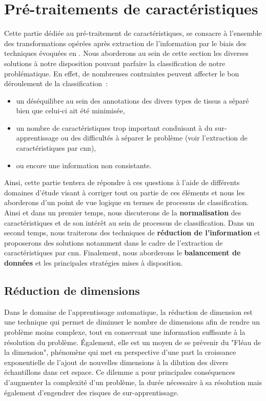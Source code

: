 \clearpage


\section{Pré-traitements de caractéristiques}
Cette partie dédiée au pré-traitement de caractéristiques, se consacre à l'ensemble des transformations opérées après extraction de l'information par le biais des techniques évoquées en . Nous aborderons au sein de cette section les diverses solutions à notre disposition pouvant parfaire la classification de notre problématique. En effet, de nombreuses contraintes peuvent affecter le bon déroulement de la classification~:
\begin{itemize}
    \item un déséquilibre au sein des annotations des divers types de tissus a séparé bien que celui-ci ait été minimisée,
    \item un nombre de caractéristiques trop important conduisant à du sur-apprentissage ou des difficultés à séparer le problème (voir l'extraction de caractéristiques par \gls{cnn}),
    \item ou encore une information non consistante.
\end{itemize}\par

Ainsi, cette partie tentera de répondre à ces questions à l'aide de différents domaines d'étude visant à corriger tout ou partie de ces éléments et nous les aborderons d'un point de vue logique en termes de processus de classification. Ainsi et dans un premier temps, nous discuterons de la \textbf{normalisation} des caractéristiques et de son intérêt au sein de processus de classification. Dans un second temps, nous traiterons des techniques de \textbf{réduction de l'information} et proposerons des solutions notamment dans le cadre de l'extraction de caractéristiques par \gls{cnn}. Finalement, nous aborderons le \textbf{balancement de données} et les principales stratégies mises à disposition.

\subsection{Réduction de dimensions}
Dans le domaine de l'apprentissage automatique, la réduction de dimension est une technique qui permet de diminuer le nombre de dimensions afin de rendre un problème moins complexe, tout en conservant une information suffisante à la résolution du problème. Également, elle est un moyen de se prévenir du "Fléau de la dimension", phénomène qui met en perspective d'une part la croissance exponentielle de l'ajout de nouvelles dimensions à la dilution des divers échantillons dans cet espace. Ce dilemme a pour principales conséquences d'augmenter la complexité d'un problème, la durée nécessaire à sa résolution mais également d'engendrer des risques de sur-apprentissage.\par

